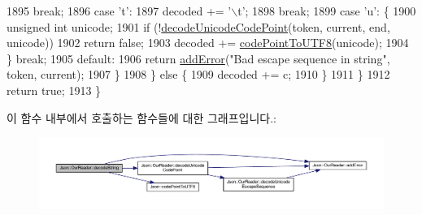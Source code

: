 \begin{DoxyCode}
1895         \textcolor{keywordflow}{break};
1896       \textcolor{keywordflow}{case} \textcolor{charliteral}{'t'}:
1897         decoded += \textcolor{charliteral}{'\(\backslash\)t'};
1898         \textcolor{keywordflow}{break};
1899       \textcolor{keywordflow}{case} \textcolor{charliteral}{'u'}: \{
1900         \textcolor{keywordtype}{unsigned} \textcolor{keywordtype}{int} unicode;
1901         \textcolor{keywordflow}{if} (!\hyperlink{class_json_1_1_our_reader_ac1bf03c161ece082e48da450c50f528d}{decodeUnicodeCodePoint}(token, current, end, unicode))
1902           \textcolor{keywordflow}{return} \textcolor{keyword}{false};
1903         decoded += \hyperlink{namespace_json_a33f8bda65a5b1fc4f5ddc39cb03dc742}{codePointToUTF8}(unicode);
1904       \} \textcolor{keywordflow}{break};
1905       \textcolor{keywordflow}{default}:
1906         \textcolor{keywordflow}{return} \hyperlink{class_json_1_1_our_reader_aa6a920311e6408ff3a45324d49da18a6}{addError}(\textcolor{stringliteral}{"Bad escape sequence in string"}, token, current);
1907       \}
1908     \} \textcolor{keywordflow}{else} \{
1909       decoded += c;
1910     \}
1911   \}
1912   \textcolor{keywordflow}{return} \textcolor{keyword}{true};
1913 \}
\end{DoxyCode}
이 함수 내부에서 호출하는 함수들에 대한 그래프입니다.\+:\nopagebreak
\begin{figure}[H]
\begin{center}
\leavevmode
\includegraphics[width=350pt]{class_json_1_1_our_reader_a5046dfa5d43b1770a091aac0a63a9f4b_cgraph}
\end{center}
\end{figure}
\mbox{\label{class_json_1_1_our_reader_ac1bf03c161ece082e48da450c50f528d}} 

